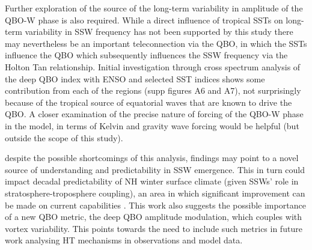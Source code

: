 Further exploration of the source of the long-term variability in amplitude of the QBO-W phase is also required. While a direct influence of tropical SSTs on long-term variability in SSW frequency has not been supported by this study there may nevertheless be an important teleconnection via the QBO, in which the SSTs influence the QBO which subsequently influences the SSW frequency via the Holton Tan relationship. Initial investigation through cross spectrum analysis of the deep QBO index with ENSO and selected SST indices shows some contribution from each of the regions (supp figures A6 and A7), not surprisingly because of the tropical source of equatorial waves that are known to drive the QBO. A closer examination of the precise nature of forcing of the QBO-W phase in the model, in terms of Kelvin and gravity wave forcing would be helpful (but outside the scope of this study).

despite the possible shortcomings of this analysis, findings may point to a novel source of understanding and predictability in SSW emergence. This in turn could impact decadal predictability of NH winter surface climate (given SSWs' role in stratosphere-troposphere coupling), an area in which significant improvement can be made on current capabilities \citep{Zhang2019}. This work also suggests the possible importance of a new QBO metric, the deep QBO amplitude modulation, which couples with vortex variability. This points towards the need to include such metrics in future work analysing HT mechanisms in observations and model data.